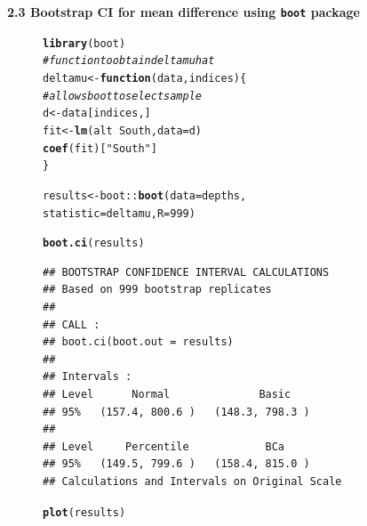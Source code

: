 \documentclass[10pt,handout]{beamer}\usepackage[]{graphicx}\usepackage[]{color}
\makeatletter
\newcommand{\hlnum}[1]{\textcolor[rgb]{0.686,0.059,0.569}{#1}}%
\newcommand{\hlstr}[1]{\textcolor[rgb]{0.192,0.494,0.8}{#1}}%
\newcommand{\hlcom}[1]{\textcolor[rgb]{0.678,0.584,0.686}{\textit{#1}}}%
\newcommand{\hlopt}[1]{\textcolor[rgb]{0,0,0}{#1}}%
\newcommand{\hlstd}[1]{\textcolor[rgb]{0.345,0.345,0.345}{#1}}%
\newcommand{\hlkwa}[1]{\textcolor[rgb]{0.161,0.373,0.58}{\textbf{#1}}}%
\newcommand{\hlkwb}[1]{\textcolor[rgb]{0.69,0.353,0.396}{#1}}%
\newcommand{\hlkwc}[1]{\textcolor[rgb]{0.333,0.667,0.333}{#1}}%
\newcommand{\hlkwd}[1]{\textcolor[rgb]{0.737,0.353,0.396}{\textbf{#1}}}%
\newenvironment{kframe}{%
 \def\at@end@of@kframe{}%
 \ifinner\ifhmode%
  \def\at@end@of@kframe{\end{minipage}}%
  \begin{minipage}{\columnwidth}%
 \fi\fi%
 \def\FrameCommand##1{\hskip\@totalleftmargin \hskip-\fboxsep
 \colorbox{shadecolor}{##1}\hskip-\fboxsep
     \hskip-\linewidth \hskip-\@totalleftmargin \hskip\columnwidth}%
 \MakeFramed {\advance\hsize-\width
   \@totalleftmargin\z@ \linewidth\hsize
   \@setminipage}}%
 {\par\unskip\endMakeFramed%
 \at@end@of@kframe}
\newenvironment{knitrout}{}{} %
\makeatother
\begin{document}
\begin{frame}
\begin{figure}
\begin{minipage}[h]{0.50\linewidth}
\begin{knitrout}
{}


\end{knitrout}
\end{minipage}
\end{figure}
	
	
\end{frame}




\begin{frame}
		\textbf{2.3 Bootstrap CI for mean difference using \texttt{boot} package}
\begin{figure}
	\begin{minipage}[h]{0.40\linewidth}
\begin{knitrout}\tiny
{}\color{fgcolor}\begin{kframe}
\begin{alltt}
\hlkwd{library}\hlstd{(boot)}
\hlcom{# function to obtain deltamu hat}
\hlstd{deltamu} \hlkwb{<-} \hlkwa{function}\hlstd{(}\hlkwc{data}\hlstd{,} \hlkwc{indices}\hlstd{) \{}
        \hlcom{# allows boot to select sample}
        \hlstd{d} \hlkwb{<-} \hlstd{data[indices,]}
        \hlstd{fit} \hlkwb{<-} \hlkwd{lm}\hlstd{(alt} \hlopt{~} \hlstd{South,} \hlkwc{data}\hlstd{=d)}
        \hlkwd{coef}\hlstd{(fit)[}\hlstr{"South"}\hlstd{]}
\hlstd{\}}

\hlstd{results} \hlkwb{<-} \hlstd{boot}\hlopt{::}\hlkwd{boot}\hlstd{(}\hlkwc{data} \hlstd{= depths,}
\hlkwc{statistic} \hlstd{= deltamu,} \hlkwc{R}\hlstd{=}\hlnum{999}\hlstd{)}

\hlkwd{boot.ci}\hlstd{(results)}
\end{alltt}
\begin{verbatim}
## BOOTSTRAP CONFIDENCE INTERVAL CALCULATIONS
## Based on 999 bootstrap replicates
## 
## CALL : 
## boot.ci(boot.out = results)
## 
## Intervals : 
## Level      Normal              Basic         
## 95%   (157.4, 800.6 )   (148.3, 798.3 )  
## 
## Level     Percentile            BCa          
## 95%   (149.5, 799.6 )   (158.4, 815.0 )  
## Calculations and Intervals on Original Scale
\end{verbatim}
\end{kframe}
\end{knitrout}
		
	\end{minipage}
	\hspace{0.4cm}
	\begin{minipage}[h]{0.50\linewidth}
\begin{knitrout}\tiny
{}\color{fgcolor}\begin{kframe}
\begin{alltt}
\hlkwd{plot}\hlstd{(results)}
\end{alltt}
\end{kframe}


\end{knitrout}
\end{minipage}
\end{figure}
\end{frame}
\end{document}
